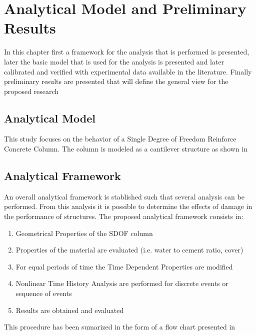\chapter{Analytical Model and Preliminary Results}
In this chapter first a framework for the analysis that is performed is presented, later the basic model that is used for the analysis is presented and later calibrated and verified with experimental data available in the literature. Finally preliminary results are presented that will define the general view for the proposed research

\section{Analytical Model}

This study focuses on the behavior of a Single Degree of Freedom Reinforce Concrete Column. The column is modeled as a cantilever structure as shown in \fref{}

\section{Analytical Framework}

An overall analytical framework is stablished such that several analysis can be performed. From this analysis it is possible to determine the effects of damage in the performance of structures. The proposed analytical framework consists in:

\begin{enumerate}
	\item Geometrical Properties of the SDOF column 
	\item Properties of the material are evaluated (i.e. water to cement ratio, cover)
	\item For equal periods of time the Time Dependent Properties are modified
	\item Nonlinear Time History Analysis are performed for discrete events or sequence of events
	\item Results are obtained and evaluated
\end{enumerate}

This procedure has been sumarized in the form of a flow chart presented in 

